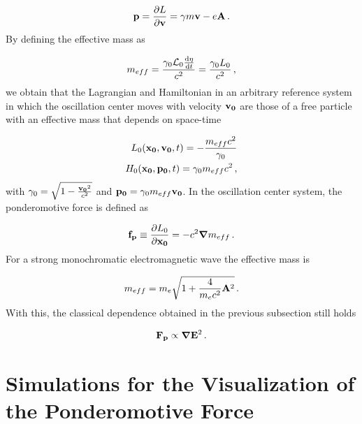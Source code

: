 \documentclass[12pt, class=report, crop=false]{standalone}
\begin{document}
\begin{equation}
  \vb{p} = \pdv{L}{\vb{v}} = \gamma m \vb{v} - e\vb{A}\,.
\end{equation}
By defining the effective mass as

\begin{equation}
  m_{eff} = \frac{\gamma_0 \mathcal{L}_0 \dv{\eta}{t}}{c^2} = \frac{\gamma_0 L_0}{c^2}\,,
\end{equation}
we obtain that the Lagrangian and Hamiltonian in an arbitrary reference system in which the oscillation center moves with velocity \(\vb{v_0}\) are those of a free particle with an effective mass that depends on space-time

\begin{subequations}
  \begin{align}
    L_0 (\vb{x_0},\vb{v_0}, t) = - \frac{m_{eff} c^2}{\gamma_0}\\
    H_0 (\vb{x_0},\vb{p_0}, t) = \gamma_0 m_{eff} c^2\,,
  \end{align}
\end{subequations}
with \(\gamma_0 = \sqrt{1-\frac{\vb{v_0}^2}{c^2}}\) and \(\vb{p_0} = \gamma_0 m_{eff} \vb{v_0}\). In the oscillation center system, the ponderomotive force is defined as

\begin{equation}
  \vb{f_p} \equiv \pdv{L_0}{\vb{x_0}} = -c^2 \grad{m_{eff}}\,.
\end{equation}
For a strong monochromatic electromagnetic wave the effective mass is

\begin{equation}
  m_{eff} = m_e \sqrt{1 + \frac{4}{m_e c^2} \vb{A}^2}\,.
\end{equation}
With this, the classical dependence obtained in the previous subsection still holds

\begin{equation}
  \vb{F_p} \propto \grad{\vb{E}^2}\,.
\end{equation}

\section{Simulations for the Visualization of the Ponderomotive Force}
\label{sec:ponderomotive-graphs}
\end{document}
